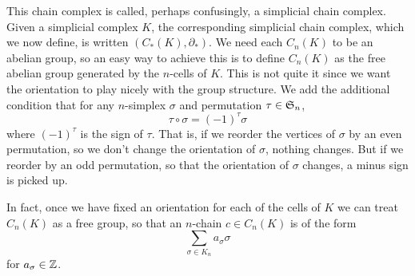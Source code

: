 \documentclass[../main.tex]{subfiles}
\begin{document}
This chain complex is called, perhaps confusingly, a simplicial chain complex. Given a
simplicial complex \( K \), the corresponding simplicial chain complex, which we now
define, is written \( (C_\ast(K), \partial_\ast) \). We need each \( C_n(K) \) to be an
abelian group, so an easy way to achieve this is to define \( C_n(K) \) as the free
abelian group generated by the \( n \)-cells of \( K \). This is not quite it since we
want the orientation to play nicely with the group structure. We add the additional
condition that for any \( n \)-simplex \( \sigma \) and permutation \( \tau \in \S_n \),
\begin{equation*}
	\tau \circ \sigma = (-1)^\tau \sigma
\end{equation*}
where \( (-1)^\tau \) is the sign of \( \tau \). That is, if we reorder the vertices of \(
\sigma \) by an even permutation, so we don't change the orientation of \( \sigma \),
nothing changes. But if we reorder by an odd permutation, so that the orientation of \(
\sigma \) changes, a minus sign is picked up. 

In fact, once we have fixed an orientation for each of the cells of \( K \) we can
treat \( C_n(K) \) as a free group, so that an \( n \)-chain \( c \in C_n(K) \) is of the
form
\begin{equation*}
	\sum_{\sigma \in K_n} a_\sigma \sigma
\end{equation*}
for \( a_\sigma \in \Z \). 
\end{document}
